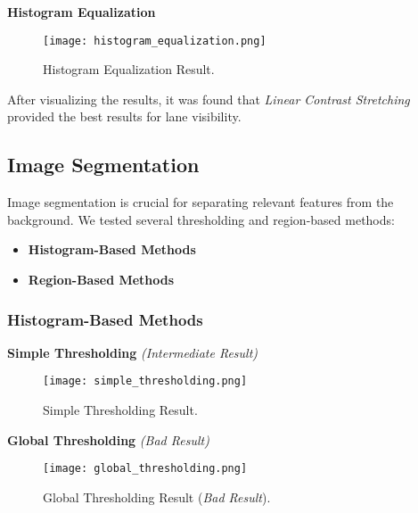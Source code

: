 \documentclass[12pt,a4paper]{article}
\begin{document}
\vspace{1em} %
\textbf{Histogram Equalization}

\begin{figure}[h!]
    \centering
    \texttt{[image: histogram\_equalization.png]} %
    \caption{Histogram Equalization Result.}
    \label{fig:histogram_equalization}
\end{figure}

After visualizing the results, it was found that \textit{Linear Contrast Stretching} provided the best results for lane visibility.

\newpage %

\subsection{Image Segmentation}

Image segmentation is crucial for separating relevant features from the background. We tested several thresholding and region-based methods:

\begin{itemize}
    \item \textbf{Histogram-Based Methods}
    \item \textbf{Region-Based Methods} 
\end{itemize}

\subsubsection*{\textbf{Histogram-Based Methods}}

\vspace{0.5em} %
\hspace{1em} \textbf{Simple Thresholding} \textit{(Intermediate Result)}


\begin{figure}[h!]
    \centering
    \texttt{[image: simple\_thresholding.png]}
    \caption{Simple Thresholding Result.}
    \label{fig:simple_thresholding}
\end{figure}

\vspace{0.5em} %
 \textbf{Global Thresholding }\textit{(Bad Result)}

\begin{figure}[h!]
    \centering
    \texttt{[image: global\_thresholding.png]}
    \caption{Global Thresholding Result (\textit{Bad Result}).}
    \label{fig:global_thresholding}
\end{figure}
\end{document}
